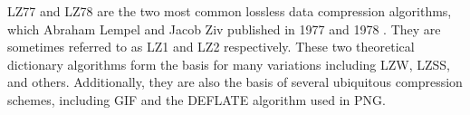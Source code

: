 LZ77 and LZ78 are the two most common lossless data compression algorithms, which Abraham Lempel and Jacob Ziv published in 1977\cite{doc3} and 1978 \cite{doc1}. They are sometimes referred to as LZ1 and LZ2 respectively. These two theoretical dictionary algorithms form the basis for many variations including LZW, LZSS, and others. Additionally, they are also the basis of several ubiquitous compression schemes, including GIF and the DEFLATE algorithm used in PNG.
